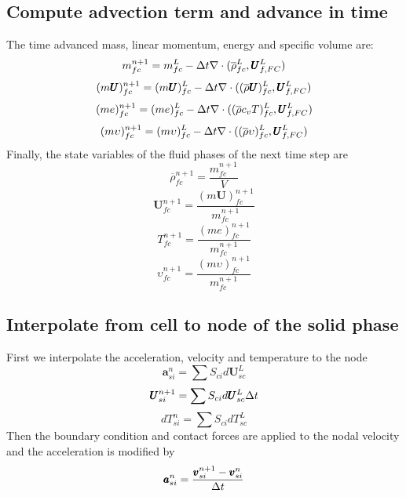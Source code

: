 \documentclass[preprint,12pt]{elsarticle}
\providecommand{\DIFadd}[1]{{\protect\color{blue}\uwave{#1}}} %
\providecommand{\DIFaddbegin}{} %
\providecommand{\DIFaddend}{} %
\newcommand{\DIFaddincludegraphics}[2][]{{\color{blue}\fbox{\DIFOincludegraphics[#1]{#2}}}} %
\DeclareRobustCommand{\DIFaddbegin}{\DIFOaddbegin \let\includegraphics\DIFaddincludegraphics} %
\DeclareRobustCommand{\DIFaddend}{\DIFOaddend \let\includegraphics\DIFOincludegraphics} %
\begin{document}
\subsection{\textsf{Compute advection term and advance in time}}
The time advanced mass, linear momentum, energy and specific volume are:
%
%
\begin{equation}
 m_{fc}^{n+1} = m_{fc}^L - \Delta{t}  \nabla \cdot (\overline{\rho}_{fc}^L,\pmb{U}_{f,FC}^{L})
\end {equation}
%
%
\begin{equation}
 (m \pmb{U})_{fc}^{n+1} = (m \pmb{U})_{fc}^L - \Delta{t}  \nabla \cdot ((\overline{\rho} \pmb{U})_{fc}^L,\pmb{U}_{f,FC}^{L})
\end {equation}
%
%
\begin{equation}
 (me)_{fc}^{n+1} = (me)_{fc}^L - \Delta{t}  \nabla \cdot ((\overline{\rho} c_v T)_{fc}^L,\pmb{U}_{f,FC}^{L})
\end {equation}
%
%
\begin{equation}
 (m \upsilon)_{fc}^{n+1} = (m \upsilon)_{fc}^L - \Delta{t}  \nabla \cdot ((\overline{\rho} \upsilon)_{fc}^L,\pmb{U}_{f,FC}^{L})
\end {equation}
%
%
Finally, the state variables of the fluid phases of the next time step are
%
%
\begin{equation}
\overline{\rho}_{fc}^{n+1} = \frac{m_{fc}^{n+1}}{V}
\end {equation}
%
%
\begin{equation}
 \pmb{U}_{fc}^{n+1} = \frac{(m \pmb{U})_{fc}^{n+1}}{m_{fc}^{n+1}} 
\end {equation}
%
%
\begin{equation}
 T_{fc}^{n+1} = \frac{(me)_{fc}^{n+1}}{m_{fc}^{n+1}}
\end {equation}
%
%
\begin{equation}
 \upsilon_{fc}^{n+1} = \frac{(m \upsilon)_{fc}^{n+1}}{m_{fc}^{n+1}}
\end {equation}
%
%
\subsection{\textsf{Interpolate from cell to node of the solid phase}}
%
First we interpolate the acceleration, velocity and temperature \DIFaddbegin \DIFadd{rate }\DIFaddend to the node
%
%
\begin{equation}
 \pmb{a}_{si}^n = \sum{S_{ci} d\pmb{U}_{sc}^L}
\end {equation}
%
%
\begin{equation}
 \pmb{U}_{si}^{n+1} = \sum{S_{ci} d\pmb{U}_{sc}^L} \Delta{t}
\end {equation}
%
\begin{equation}
 dT_{si}^n =  \sum{S_{ci} dT_{sc}^L}
\end {equation}
%
%
Then the boundary condition and contact forces are applied to the nodal velocity and the acceleration is modified by
%
%
\begin{equation}
     \pmb{a}_{si}^n = \frac{\pmb{v}_{si}^{n+1} - \pmb{v}_{si}^n}{\Delta{t}}
\end {equation}
%
%
\end{document}
